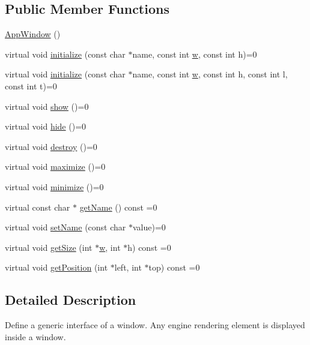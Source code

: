 \subsection*{Public Member Functions}
\begin{DoxyCompactItemize}
\item 
\hyperlink{classAppWindow_a40497071c6b8c7a1453a4ea25824497a}{App\-Window} ()
\item 
virtual void \hyperlink{classAppWindow_a075f5ee2671ae2ef1d784fb08f219f11}{initialize} (const char $\ast$name, const int \hyperlink{VectF4_8h_a56eca241e2896b9f57a79589e76fd24b}{w}, const int h)=0
\item 
virtual void \hyperlink{classAppWindow_a1445d7fea258f9a0cc0cff5b0bac3376}{initialize} (const char $\ast$name, const int \hyperlink{VectF4_8h_a56eca241e2896b9f57a79589e76fd24b}{w}, const int h, const int l, const int t)=0
\item 
virtual void \hyperlink{classAppWindow_a3e135a0853bb07888f6d0a4f683f69fb}{show} ()=0
\item 
virtual void \hyperlink{classAppWindow_af5a7e0bcc523f8ef6ddcb6809222423b}{hide} ()=0
\item 
virtual void \hyperlink{classAppWindow_abe5e564487bbf48a940966dd4b9c0ca2}{destroy} ()=0
\item 
virtual void \hyperlink{classAppWindow_a687484a2b2272823e7a05f123e53e58f}{maximize} ()=0
\item 
virtual void \hyperlink{classAppWindow_a495e4e82bd2c56f6f3af83f25accc9d5}{minimize} ()=0
\item 
virtual const char $\ast$ \hyperlink{classAppWindow_ac9c9b917ec7923f6bc031417b5081300}{get\-Name} () const =0
\item 
virtual void \hyperlink{classAppWindow_a08b53b085d4aac4cdfaa1a1b9cc0b1a7}{set\-Name} (const char $\ast$value)=0
\item 
virtual void \hyperlink{classAppWindow_aefd3fedc9909a3d99318787dbd0f3459}{get\-Size} (int $\ast$\hyperlink{VectF4_8h_a56eca241e2896b9f57a79589e76fd24b}{w}, int $\ast$h) const =0
\item 
virtual void \hyperlink{classAppWindow_ac9f6b266bae26ae743cc60e1f4a31ce0}{get\-Position} (int $\ast$left, int $\ast$top) const =0
\end{DoxyCompactItemize}


\subsection{Detailed Description}
Define a generic interface of a window. Any engine rendering element is displayed inside a window.

